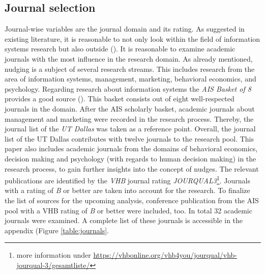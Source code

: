 \subsection{Journal selection}
Journal-wise variables are the journal domain and its rating. As suggested in existing literature, it is reasonable to not only look within the field of information systems research but also outside (\cite{webster_analyzing_2002}). It is reasonable to examine academic journals with the most influence in the research domain. As already mentioned, nudging is a subject of several research streams. This includes research from the area of information systems, management, marketing, behavioral economics, and psychology. Regarding research about information systems the \textit{AIS Basket of 8} provides a good source (\cite{alavi_review_1992}). This basket consists out of eight well-respected journals in the domain. After the AIS scholarly basket, academic journals about management and marketing were recorded in the research process. Thereby, the journal list of the \textit{UT Dallas} was taken as a reference point. Overall, the journal list of the UT Dallas contributes with twelve journals to the research pool. This paper also includes academic journals from the domains of behavioral economics, decision making and psychology (with regards to human decision making) in the research process, to gain further insights into the concept of nudges. The relevant publications are identified by the \textit{VHB} journal rating \textit{JOURQUAL3}\footnote{more information under \url{https://vhbonline.org/vhb4you/jourqual/vhb-jourqual-3/gesamtliste/}}. Journals with a rating of \textit{B} or better are taken into account for the research. To finalize the list of sources for the upcoming analysis, conference publication from the AIS pool with a VHB rating of \textit{B} or better were included, too. In total 32 academic journals were examined. A complete list of these journals is accessible in the appendix (Figure \ref{table:journals}.

